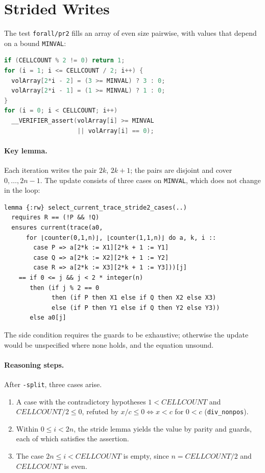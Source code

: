 \documentclass[sigconf,nonacm]{acmart}
\newcommand{\code}[1]{\texttt{#1}}
\begin{document}
\section{Strided Writes}

The test \code{forall/pr2} fills an array of even size pairwise, with values
that depend on a bound \code{MINVAL}:
\begin{lstlisting}[language=C]
if (CELLCOUNT % 2 != 0) return 1;
for (i = 1; i <= CELLCOUNT / 2; i++) {
  volArray[2*i - 2] = (3 >= MINVAL) ? 3 : 0;
  volArray[2*i - 1] = (1 >= MINVAL) ? 1 : 0;
}
for (i = 0; i < CELLCOUNT; i++)
  __VERIFIER_assert(volArray[i] >= MINVAL
                    || volArray[i] == 0);
\end{lstlisting}

\paragraph{Key lemma.} Each iteration writes the pair $2k$, $2k+1$; the
pairs are disjoint and cover $0, \ldots, 2n-1$. The update consists of three
cases on \code{MINVAL}, which does not change in the loop:
\begin{lstlisting}[language=dafny]
lemma {:rw} select_current_trace_stride2_cases(..)
  requires R == (!P && !Q)
  ensures current(trace(a0,
      for ⌊counter(0,1,n)⌋, ⌊counter(1,1,n)⌋ do a, k, i ::
        case P => a[2*k := X1][2*k + 1 := Y1]
        case Q => a[2*k := X2][2*k + 1 := Y2]
        case R => a[2*k := X3][2*k + 1 := Y3]))[j]
    == if 0 <= j && j < 2 * integer(n)
       then (if j % 2 == 0
             then (if P then X1 else if Q then X2 else X3)
             else (if P then Y1 else if Q then Y2 else Y3))
       else a0[j]
\end{lstlisting}
The side condition requires the guards to be exhaustive; otherwise the update
would be unspecified where none holds, and the equation unsound.

\paragraph{Reasoning steps.} After \code{-split}, three cases arise.
\begin{enumerate}
\item A case with the contradictory hypotheses $1 < \mathit{CELLCOUNT}$ and
  $\mathit{CELLCOUNT}/2 \le 0$, refuted by $x/c \le 0 \iff x < c$ for
  $0 < c$ (\code{div\_nonpos}).
\item Within $0 \le i < 2n$, the stride lemma yields the value by parity and
  guards, each of which satisfies the assertion.
\item The case $2n \le i < \mathit{CELLCOUNT}$ is empty, since
  $n = \mathit{CELLCOUNT}/2$ and $\mathit{CELLCOUNT}$ is even.
\end{enumerate}
\end{document}
